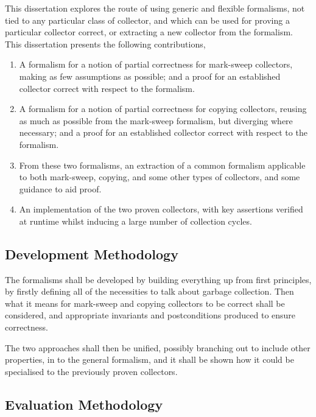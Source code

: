 This dissertation explores the route of using generic and flexible
formalisms, not tied to any particular class of collector, and which
can be used for proving a particular collector correct, or extracting
a new collector from the formalism. This dissertation presents the
following contributions,

\begin{enumerate}
  \item A formalism for a notion of partial correctness for mark-sweep
    collectors, making as few assumptions as possible; and a proof for
    an established collector correct with respect to the formalism.

  \item A formalism for a notion of partial correctness for copying
    collectors, reusing as much as possible from the mark-sweep
    formalism, but diverging where necessary; and a proof for an
    established collector correct with respect to the formalism.

  \item From these two formalisms, an extraction of a common formalism
    applicable to both mark-sweep, copying, and some other types of
    collectors, and some guidance to aid proof.

  \item An implementation of the two proven collectors, with key
    assertions verified at runtime whilst inducing a large number of
    collection cycles.
\end{enumerate}

\subsection{Development Methodology}
\label{sec:intro-goals-development}

The formalisms shall be developed by building everything up from first
principles, by firstly defining all of the necessities to talk about
garbage collection. Then what it means for mark-sweep and copying
collectors to be correct shall be considered, and appropriate
invariants and postconditions produced to ensure correctness.

The two approaches shall then be unified, possibly branching out to
include other properties, in to the general formalism, and it shall be
shown how it could be specialised to the previously proven collectors.

\subsection{Evaluation Methodology}
\label{sec:intro-goals-evaluation}

